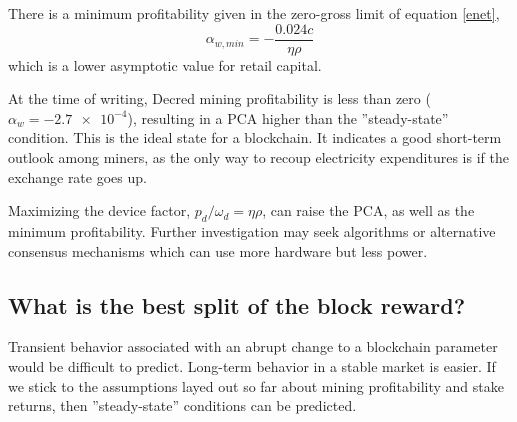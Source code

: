 \documentclass[a4paper,12pt]{article}
\begin{document}
There is a minimum profitability given in the zero-gross limit of equation \ref{enet},
%
\begin{equation}
\alpha_{w, min} = - \frac{ 0.024 c }{ \eta \rho }
\end{equation}
%
which is a lower asymptotic value for retail capital.

At the time of writing, Decred mining profitability is less than zero ($ \alpha_w = \num{-2.7e-4} $), resulting in a PCA higher than the ''steady-state'' condition. This is the ideal state for a blockchain. It indicates a good short-term outlook among miners, as the only way to recoup electricity expenditures is if the exchange rate goes up. 

Maximizing the device factor, $ p_d / \omega_d = \eta \rho $, can raise the PCA, as well as the minimum profitability. Further investigation may seek algorithms or alternative consensus mechanisms which can use more hardware but less power.

\subsection{What is the best split of the block reward?}

Transient behavior associated with an abrupt change to a blockchain parameter would be difficult to predict. Long-term behavior in a stable market is easier. If we stick to the assumptions layed out so far about mining profitability and stake returns, then ''steady-state'' conditions can be predicted. 
\end{document}
